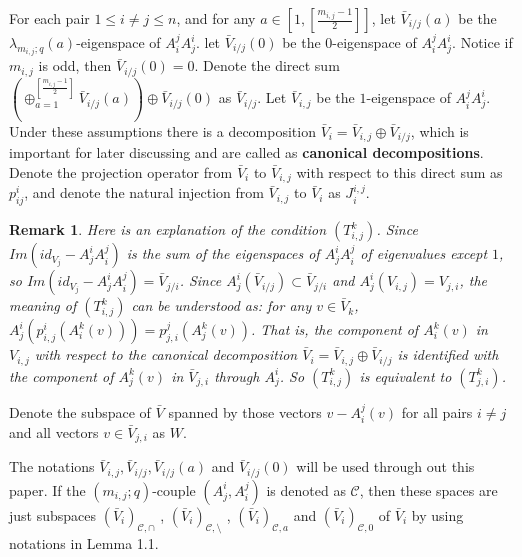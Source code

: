\def\CTEXPreproc{Created by ctex v0.2.12, don't edit!}\documentclass[11pt]{article}
\newtheorem{rem}{Remark}[section]
\begin{document}
For each pair $1\leq i\neq j\leq n$, and for any $a\in [1, [\frac{m_{i,j}-1}{2}]]$, let $\bar{V}_{i/j}(a)$ be  the $\lambda_{m_{i,j};q} (a)$-eigenspace of $A^j _i A^i _j$.  let $\bar{V}_{i/j}(0)$ be the $0$-eigenspace of $A^j _i A^i _j$. Notice if
$m_{i,j}$ is odd, then $\bar{V}_{i/j}(0)=0$.  Denote the direct sum
 $ (  \oplus^{ [\frac{m_{i,j}-1}{2}   ]   } _{a=1}  \bar{V}_{i/j}(a) )\oplus \bar{V}_{i/j} (0)   $ as  $\bar{V}_{i/j}$. Let $\bar{V}_{i,j}$ be the $1$-eigenspace of $A^j _i A^i _j$. Under these assumptions there is a decomposition $\bar{V}_i = \bar{V}_{i,j}\oplus \bar{V}_{i/j} $, which is important for later discussing and are called as \textbf{canonical decompositions}. Denote the projection operator from $\bar{V}_i$ to $\bar{V}_{i,j}$ with respect to this direct sum as \textbf{$p^{i} _{ij}$}, and denote the natural injection from $\bar{V}_{i,j}$ to $\bar{V}_i$ as \textbf{$J^{i,j} _i $}.



\begin{rem} Here is an explanation of the condition $(T^k _{i,j})$.  Since $Im (id_{V_j } - A^i _j A^j _i )$ is the sum of the eigenspaces of $A^i _j A^j _i$
 of eigenvalues except $1$, so  $Im (id_{V_j } - A^i _j A^j _i )= \bar{V}_{j/i}$. Since $A^i _j ( \bar{V}_{i/j}  )\subset \bar{V}_{j/i}$ and $A^i _j (V_{i,j})= V_{j,i}$, the meaning of $(T^k _{i,j})$ can be understood as: for any $v\in \bar{V}_k$,
  $A^i _j ( p^i _{i,j} (  A^k _i (v)    )    )= p^j _{j,i} ( A^k _j (v)   )   $. That is, the component of $A^k _i (v)$ in $V_{i,j }$ with respect to the canonical decomposition $\bar{V}_i = \bar{V}_{i,j} \oplus \bar{V}_{i/j}$ is identified with the component of $A^k _j (v)$ in $\bar{V}_{j,i}$ through $A^i _j$. So $(T^k _{i,j})$ is equivalent to $(T^k _{j,i})$.
  \end{rem}



  Denote the subspace of $\bar{V}$ spanned by those vectors $ v-A^j _i (v) $ for all pairs $i\neq j$ and all vectors $v\in \bar{V}_{j,i} $ as $W$.

 The notations $\bar{V}_{i,j}, \bar{V}_{i/j} , \bar{V}_{i/j}(a)$ and $ \bar{V}_{i/j}(0) $ will be used through out this paper. If the
 $(m_{i,j} ;q)$-couple $( A^i _j , A^j _i  )$ is denoted as $\mathscr{C}$, then these spaces are just subspaces
 $ (\bar{V}_i )_{\mathscr{C}, \cap } $ , $ (\bar{V}_i )_{\mathscr{C}, \setminus} $ , $(\bar{V}_i )_{\mathscr{C}, a }$  and
 $(\bar{V}_i )_{\mathscr{C}, 0 }$  of $\bar{V}_{i}$ by using notations in Lemma 1.1.
\end{document}

